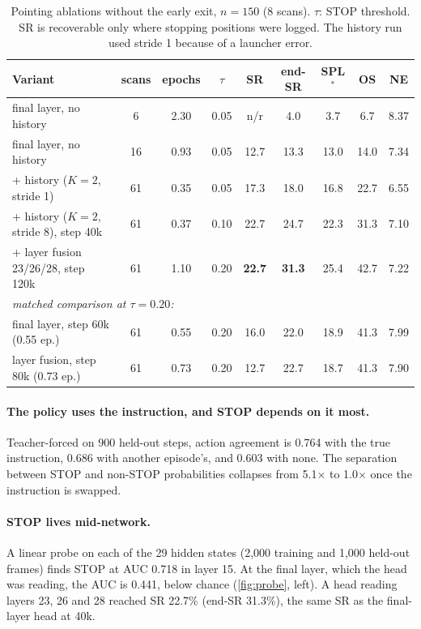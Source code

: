\documentclass[11pt]{article}
\begin{document}
\begin{table}[t]
\centering\small
\caption{Pointing ablations without the early exit, $n{=}150$ (8 scans). $\tau$: STOP threshold. SR is recoverable
only where stopping positions were logged. The history run used stride 1 because of a launcher error.}
\label{tab:pt}
\setlength{\tabcolsep}{4pt}
\begin{tabular}{lcccccccc}
\toprule
Variant & scans & epochs & $\tau$ & SR & end-SR & SPL$^*$ & OS & NE \\
\midrule
final layer, no history & 6 & 2.30 & 0.05 & n/r & 4.0 & 3.7 & 6.7 & 8.37 \\
final layer, no history & 16 & 0.93 & 0.05 & 12.7 & 13.3 & 13.0 & 14.0 & 7.34 \\
+ history ($K{=}2$, stride 1) & 61 & 0.35 & 0.05 & 17.3 & 18.0 & 16.8 & 22.7 & 6.55 \\
+ history ($K{=}2$, stride 8), step 40k & 61 & 0.37 & 0.10 & 22.7 & 24.7 & 22.3 & 31.3 & 7.10 \\
+ layer fusion 23/26/28, step 120k & 61 & 1.10 & 0.20 & \textbf{22.7} & \textbf{31.3} & 25.4 & 42.7 & 7.22 \\
\midrule
\multicolumn{9}{l}{\emph{matched comparison at $\tau{=}0.20$:}} \\
final layer, step 60k (0.55 ep.) & 61 & 0.55 & 0.20 & 16.0 & 22.0 & 18.9 & 41.3 & 7.99 \\
layer fusion, step 80k (0.73 ep.) & 61 & 0.73 & 0.20 & 12.7 & 22.7 & 18.7 & 41.3 & 7.90 \\
\bottomrule
\end{tabular}
\end{table}

\paragraph{The policy uses the instruction, and STOP depends on it most.}
Teacher-forced on 900 held-out steps, action agreement is 0.764 with the true instruction, 0.686 with another
episode's, and 0.603 with none. The separation between STOP and non-STOP probabilities collapses from 5.1$\times$ to
1.0$\times$ once the instruction is swapped.

\paragraph{STOP lives mid-network.}
A linear probe on each of the 29 hidden states (2,000 training and 1,000 held-out frames) finds STOP at AUC 0.718 in
layer 15. At the final layer, which the head was reading, the AUC is 0.441, below chance (\cref{fig:probe}, left). A
head reading layers 23, 26 and 28 reached SR 22.7\% (end-SR 31.3\%), the same SR as the final-layer head at 40k.
\end{document}
